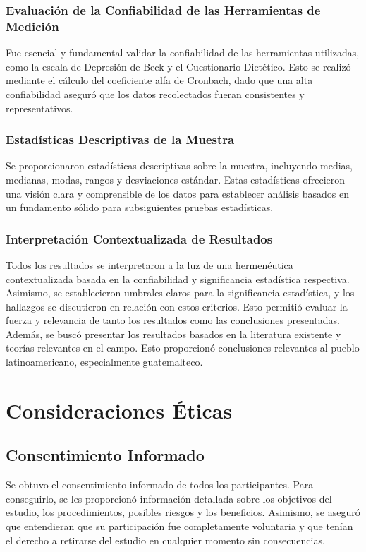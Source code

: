\documentclass[man]{apa7}
\begin{document}
	\subsubsection{Evaluación de la Confiabilidad de las Herramientas de Medición}
	Fue esencial y fundamental validar la confiabilidad de las herramientas utilizadas, como la escala de Depresión de Beck y el Cuestionario Dietético. Esto se realizó mediante el cálculo del coeficiente alfa de Cronbach, dado que una alta confiabilidad aseguró que los datos recolectados fueran consistentes y representativos.

	\subsubsection{Estadísticas Descriptivas de la Muestra}
	Se proporcionaron estadísticas descriptivas sobre la muestra, incluyendo medias, medianas, modas, rangos y desviaciones estándar. Estas estadísticas ofrecieron una visión clara y comprensible de los datos para establecer análisis basados en un fundamento sólido para subsiguientes pruebas estadísticas.

	\subsubsection{Interpretación Contextualizada de Resultados} Todos los
	resultados se interpretaron a la luz de una hermenéutica contextualizada
	basada en la confiabilidad y significancia estadística respectiva.
	Asimismo, se establecieron umbrales claros para la significancia
	estadística, y los hallazgos se discutieron en relación con estos
	criterios. Esto permitió evaluar la fuerza y relevancia de tanto
	los resultados como las conclusiones presentadas. Además, se buscó
	presentar los resultados basados en la literatura existente y
	teorías relevantes en el campo. Esto proporcionó conclusiones
	relevantes al pueblo latinoamericano, especialmente guatemalteco.

	\section{Consideraciones Éticas}\label{consideraciones-uxe9ticas}

	\subsection{Consentimiento Informado}\label{consentimiento-informado}

	Se obtuvo el consentimiento informado de todos los participantes. Para
	conseguirlo, se les proporcionó información detallada sobre los
	objetivos del estudio, los procedimientos, posibles riesgos y los
	beneficios. Asimismo, se aseguró que entendieran que su participación fue
	completamente voluntaria y que tenían el derecho a retirarse del estudio
	en cualquier momento sin consecuencias.
\end{document}
